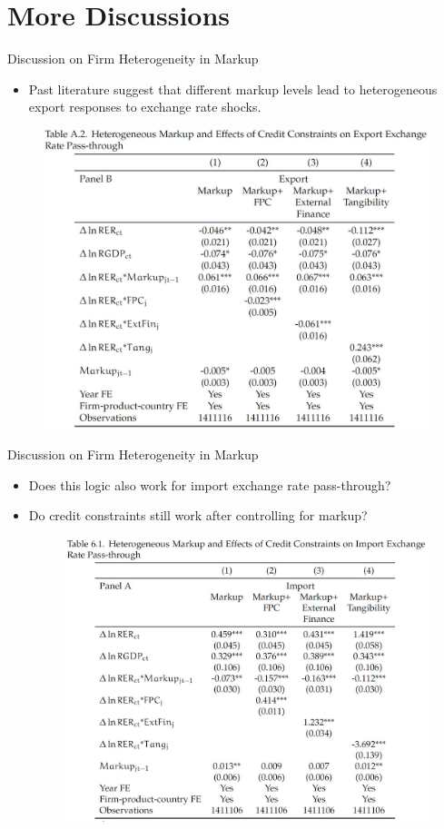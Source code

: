 \documentclass[10pt]{beamer}
\begin{document}
\section{More Discussions}

\begin{frame}{Discussion on Firm Heterogeneity in Markup}
	\begin{itemize}
		\item Past literature suggest that different markup levels lead to
		heterogeneous export responses to exchange rate shocks.
	\end{itemize}
	\begin{figure}[htbp]
		\centering
		\includegraphics[width=0.75\columnwidth]{TableA2.jpg}
		\label{tabA2}
	\end{figure}
\end{frame}

\begin{frame}{Discussion on Firm Heterogeneity in Markup}
	\begin{itemize}
		\item Does this logic also work for import exchange rate pass-through?
		\item Do credit constraints still work after controlling for markup?
	\begin{figure}[htbp]
		\centering
		\includegraphics[width=0.75\columnwidth]{Table6.1.jpg}
		\label{tab6.1}
	\end{figure}
		
	\end{itemize}	
\end{frame}
\end{document}
